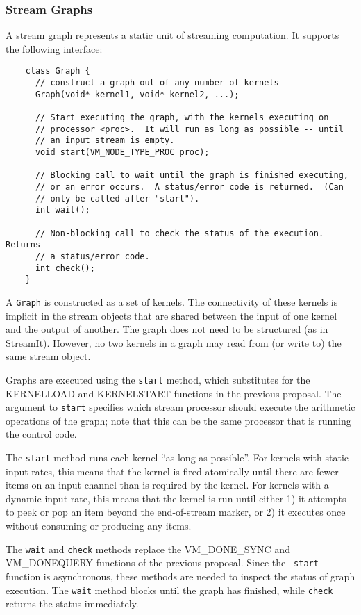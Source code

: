 \subsubsection{Stream Graphs}
\label{sec:streamgraph}

A stream graph represents a static unit of streaming computation.  It
supports the following interface:
{\small
\begin{verbatim}
    class Graph {
      // construct a graph out of any number of kernels
      Graph(void* kernel1, void* kernel2, ...);

      // Start executing the graph, with the kernels executing on
      // processor <proc>.  It will run as long as possible -- until
      // an input stream is empty.
      void start(VM_NODE_TYPE_PROC proc);

      // Blocking call to wait until the graph is finished executing,
      // or an error occurs.  A status/error code is returned.  (Can 
      // only be called after "start").
      int wait();

      // Non-blocking call to check the status of the execution.  Returns
      // a status/error code.
      int check();
    }
\end{verbatim}}

A {\tt Graph} is constructed as a set of kernels.  The connectivity of
these kernels is implicit in the stream objects that are shared
between the input of one kernel and the output of another.  The graph
does not need to be structured (as in StreamIt).  However, no two
kernels in a graph may read from (or write to) the same stream object.

Graphs are executed using the {\tt start} method, which substitutes for
the KERNELLOAD and KERNELSTART functions in the previous proposal.
The argument to {\tt start} specifies which stream processor should
execute the arithmetic operations of the graph; note that this can be
the same processor that is running the control code.

The {\tt start} method runs each kernel ``as long as possible''.  For
kernels with static input rates, this means that the kernel is fired
atomically until there are fewer items on an input channel than is
required by the kernel.  For kernels with a dynamic input rate, this
means that the kernel is run until either 1) it attempts to peek or
pop an item beyond the end-of-stream marker, or 2) it executes once
without consuming or producing any items.

The {\tt wait} and {\tt check} methods replace the VM\_DONE\_SYNC and
VM\_DONEQUERY functions of the previous proposal.  Since the {\tt
start} function is asynchronous, these methods are needed to inspect
the status of graph execution.  The {\tt wait} method blocks until the
graph has finished, while {\tt check} returns the status immediately.

